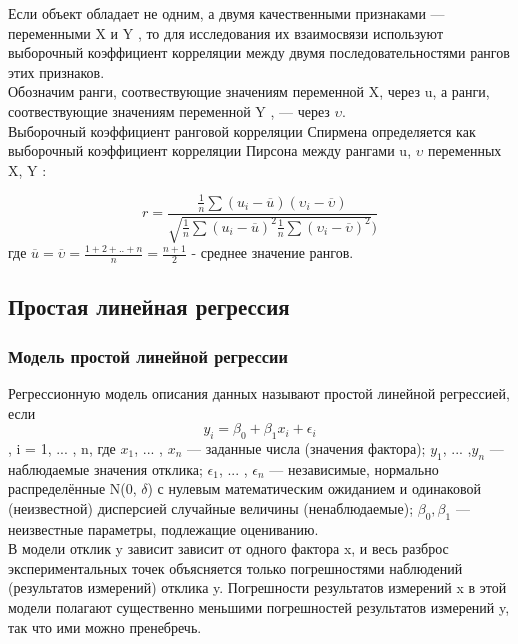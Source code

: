 \documentclass[a4]{article}
\begin{document}
						Если объект обладает не одним, а двумя качественными признаками — переменными X и Y , то для исследования их взаимосвязи используют выборочный коэффициент корреляции между двумя последовательностями рангов этих признаков.\\
						Обозначим ранги, соотвествующие значениям переменной X, через u, а ранги, соотвествующие значениям переменной Y , — через $\upsilon$.\\
						Выборочный коэффициент ранговой корреляции Спирмена определяется как выборочный коэффициент корреляции Пирсона между рангами u, $\upsilon$ переменных X, Y :
						
						$$r = \frac{\frac{1}{n} \sum(u_i - \overline{u})(\upsilon_i - \overline{\upsilon})}{\sqrt{\frac{1}{n} \sum (u_i - \overline{u})^2 \frac{1}{n} \sum(\upsilon_i - \overline{\upsilon})^2})}$$
						где $\overline{u} = \overline{\upsilon} = \frac{1 + 2 + .. + n}{n} = \frac{n + 1}{2}$ - среднее значение рангов.
						
						\subsection{Простая линейная регрессия}
						\subsubsection{Модель простой линейной регрессии}
						Регрессионную модель описания данных называют простой линейной регрессией, если
						$$y_i = \beta_0 + \beta_1x_i + \epsilon_i$$ , i = 1, ... , n, где $x_1$, ... , $x_n$ — заданные числа (значения фактора); $y_1$, ... ,$y_n$  — наблюдаемые значения отклика; $\epsilon_1$, ... , $\epsilon_n$ — независимые, нормально распределённые N(0, $\delta$) с нулевым математическим ожиданием и одинаковой (неизвестной) дисперсией случайные величины (ненаблюдаемые); $\beta_0, \beta_1$ — неизвестные параметры, подлежащие оцениванию.\\
						В модели отклик y зависит зависит от одного фактора x, и весь разброс экспериментальных точек объясняется только погрешностями наблюдений (результатов измерений) отклика y. Погрешности результатов измерений x в этой модели полагают существенно меньшими погрешностей результатов измерений y, так что ими можно пренебречь.
						
\end{document}
